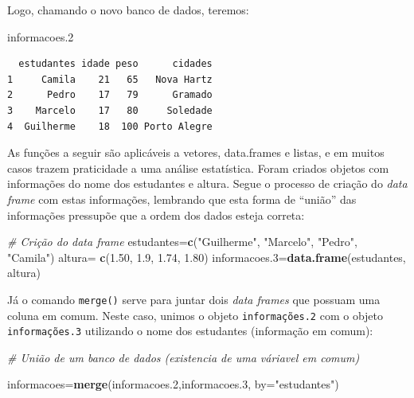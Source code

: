 \documentclass[12pt,portuguese,oneside]{book}
\newenvironment{Shaded}{\begin{snugshade}}{\end{snugshade}}
\newcommand{\KeywordTok}[1]{\textcolor[rgb]{0.13,0.29,0.53}{\textbf{#1}}}
\newcommand{\DataTypeTok}[1]{\textcolor[rgb]{0.13,0.29,0.53}{#1}}
\newcommand{\DecValTok}[1]{\textcolor[rgb]{0.00,0.00,0.81}{#1}}
\newcommand{\FloatTok}[1]{\textcolor[rgb]{0.00,0.00,0.81}{#1}}
\newcommand{\StringTok}[1]{\textcolor[rgb]{0.31,0.60,0.02}{#1}}
\newcommand{\CommentTok}[1]{\textcolor[rgb]{0.56,0.35,0.01}{\textit{#1}}}
\newcommand{\NormalTok}[1]{#1}
\begin{document}
Logo, chamando o novo banco de dados, teremos:

\begin{Shaded}
\begin{Highlighting}[]
\NormalTok{informacoes.}\DecValTok{2} 
\end{Highlighting}
\end{Shaded}

\begin{verbatim}
  estudantes idade peso      cidades
1     Camila    21   65   Nova Hartz
2      Pedro    17   79      Gramado
3    Marcelo    17   80     Soledade
4  Guilherme    18  100 Porto Alegre
\end{verbatim}

As funções a seguir são aplicáveis a vetores, data.frames e listas, e em
muitos casos trazem praticidade a uma análise estatística. Foram criados
objetos com informações do nome dos estudantes e altura. Segue o
processo de criação do \emph{data frame} com estas informações,
lembrando que esta forma de ``união'' das informações pressupõe que a
ordem dos dados esteja correta:

\begin{Shaded}
\begin{Highlighting}[]
\CommentTok{# Crição do data frame}
\NormalTok{estudantes=}\KeywordTok{c}\NormalTok{(}\StringTok{"Guilherme"}\NormalTok{, }\StringTok{"Marcelo"}\NormalTok{, }\StringTok{"Pedro"}\NormalTok{, }\StringTok{"Camila"}\NormalTok{)}
\NormalTok{altura=}\StringTok{ }\KeywordTok{c}\NormalTok{(}\FloatTok{1.50}\NormalTok{, }\FloatTok{1.9}\NormalTok{, }\FloatTok{1.74}\NormalTok{, }\FloatTok{1.80}\NormalTok{)}
\NormalTok{informacoes.}\DecValTok{3}\NormalTok{=}\KeywordTok{data.frame}\NormalTok{(estudantes, altura)}
\end{Highlighting}
\end{Shaded}

Já o comando \texttt{merge()} serve para juntar dois \emph{data frames}
que possuam uma coluna em comum. Neste caso, unimos o objeto
\texttt{informações.2} com o objeto \texttt{informações.3} utilizando o
nome dos estudantes (informação em comum):

\begin{Shaded}
\begin{Highlighting}[]
\CommentTok{# União de um banco de dados (existencia de uma váriavel em comum)}

\NormalTok{informacoes=}\KeywordTok{merge}\NormalTok{(informacoes.}\DecValTok{2}\NormalTok{,informacoes.}\DecValTok{3}\NormalTok{, }\DataTypeTok{by=}\StringTok{"estudantes"}\NormalTok{)}
\end{Highlighting}
\end{Shaded}
\end{document}
